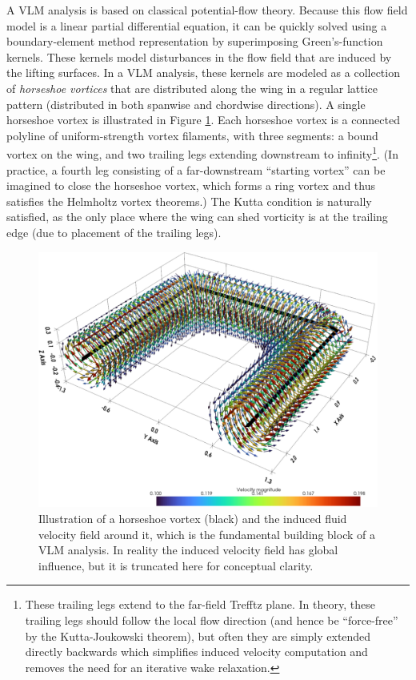 A VLM analysis is based on classical potential-flow theory. Because this flow field model is a linear partial differential equation, it can be quickly solved using a boundary-element method representation by superimposing Green's-function kernels. These kernels model disturbances in the flow field that are induced by the lifting surfaces. In a VLM analysis, these kernels are modeled as a collection of \emph{horseshoe vortices} that are distributed along the wing in a regular lattice pattern (distributed in both spanwise and chordwise directions). A single horseshoe vortex is illustrated in Figure \ref{fig:horseshoe_vortex}. Each horseshoe vortex is a connected polyline of uniform-strength vortex filaments, with three segments: a bound vortex on the wing, and two trailing legs extending downstream to infinity\footnote{These trailing legs extend to the far-field Trefftz plane. In theory, these trailing legs should follow the local flow direction (and hence be ``force-free'' by the Kutta-Joukowski theorem), but often they are simply extended directly backwards which simplifies induced velocity computation and removes the need for an iterative wake relaxation.}. (In practice, a fourth leg consisting of a far-downstream ``starting vortex'' can be imagined to close the horseshoe vortex, which forms a ring vortex and thus satisfies the Helmholtz vortex theorems.) The Kutta condition is naturally satisfied, as the only place where the wing can shed vorticity is at the trailing edge (due to placement of the trailing legs).

\begin{figure}[H]
    \centering
    \includegraphics[width=5in]{../figures/horseshoe_vortex.png}
    \caption{Illustration of a horseshoe vortex (black) and the induced fluid velocity field around it, which is the fundamental building block of a VLM analysis. In reality the induced velocity field has global influence, but it is truncated here for conceptual clarity.}
    \label{fig:horseshoe_vortex}
\end{figure}


